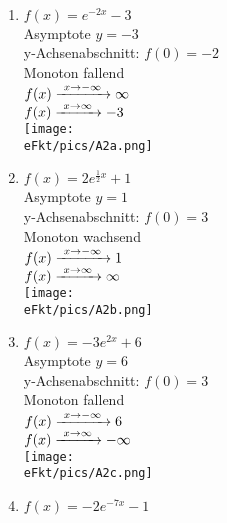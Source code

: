 \newpage
\begin{Answer}[ref=eFktA2]\\
	\begin{minipage}{\textwidth}
		\begin{minipage}[t]{0.49\textwidth}
			\begin{enumerate}[label=\alph*)]
				\item \(f(x)=e^{-2x}-3\)\\
				Asymptote \(y=-3\)\\
				y-Achsenabschnitt: \(f(0)=-2\)\\
				Monoton fallend\\
				\(f(x)\xrightarrow{\hphantom{\ }x\to-\infty\hphantom{\ }}\infty\)\\
				\(f(x)\xrightarrow{\hphantom{\ }x\to\infty\hphantom{\ }}-3\)\\
				\texttt{[image: \\eFkt/pics/A2a.png]}
				\item \(f(x)=2e^{\frac{1}{2}x}+1\)\\
				Asymptote \(y=1\)\\
				y-Achsenabschnitt: \(f(0)=3\)\\
				Monoton wachsend\\
				\(f(x)\xrightarrow{\hphantom{\ }x\to-\infty\hphantom{\ }}1\)\\
				\(f(x)\xrightarrow{\hphantom{\ }x\to\infty\hphantom{\ }}\infty\)\\
				\texttt{[image: \\eFkt/pics/A2b.png]}
			\end{enumerate}
		\end{minipage}
		\begin{minipage}[t]{0.49\textwidth}
			\begin{enumerate}[label=\alph*)]
				\setcounter{enumi}{2}
				\item \(f(x)=-3e^{2x}+6\)\\
				Asymptote \(y=6\)\\
				y-Achsenabschnitt: \(f(0)=3\)\\
				Monoton fallend\\
				\(f(x)\xrightarrow{\hphantom{\ }x\to-\infty\hphantom{\ }}6\)\\
				\(f(x)\xrightarrow{\hphantom{\ }x\to\infty\hphantom{\ }}-\infty\)\\
				\texttt{[image: \\eFkt/pics/A2c.png]}
				\item \(f(x)=-2e^{-7x}-1\)\\

\end{enumerate}
\end{minipage}
\end{minipage}
\end{Answer}
